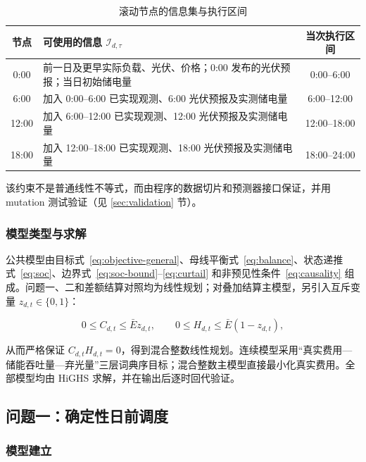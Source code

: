 \begin{table}[htbp]
	\caption{滚动节点的信息集与执行区间}
	\label{tab:information-set}
	\centering
	\begin{tabularx}{0.96\textwidth}{c X c}
		\toprule
		节点 & 可使用的信息 $\mathcal I_{d,\tau}$ & 当次执行区间 \\
		\midrule
		0:00 & 前一日及更早实际负载、光伏、价格；0:00 发布的光伏预报；当日初始储电量 & 0:00--6:00 \\
		6:00 & 加入 0:00--6:00 已实现观测、6:00 光伏预报及实测储电量 & 6:00--12:00 \\
		12:00 & 加入 6:00--12:00 已实现观测、12:00 光伏预报及实测储电量 & 12:00--18:00 \\
		18:00 & 加入 12:00--18:00 已实现观测、18:00 光伏预报及实测储电量 & 18:00--24:00 \\
		\bottomrule
	\end{tabularx}
\end{table}

该约束不是普通线性不等式，而由程序的数据切片和预测器接口保证，并用 mutation 测试验证（见 \ref{sec:validation} 节）。

\subsubsection{模型类型与求解}

公共模型由目标式~\eqref{eq:objective-general}、母线平衡式~\eqref{eq:balance}、状态递推式~\eqref{eq:soc}、边界式~\eqref{eq:soc-bound}--\eqref{eq:curtail} 和非预见性条件~\eqref{eq:causality} 组成。问题一、二和差额结算对照均为线性规划；对叠加结算主模型，另引入互斥变量 $z_{d,t}\in\{0,1\}$：

\begin{equation}
	0\le C_{d,t}\le \bar E z_{d,t},\qquad
	0\le H_{d,t}\le \bar E(1-z_{d,t}),
	\label{eq:mutual-exclusive}
\end{equation}

从而严格保证 $C_{d,t}H_{d,t}=0$，得到混合整数线性规划。连续模型采用“真实费用—储能吞吐量—弃光量”三层词典序目标；混合整数主模型直接最小化真实费用。全部模型均由 HiGHS 求解，并在输出后逐时回代验证。

\subsection{问题一：确定性日前调度}

\subsubsection{模型建立}

